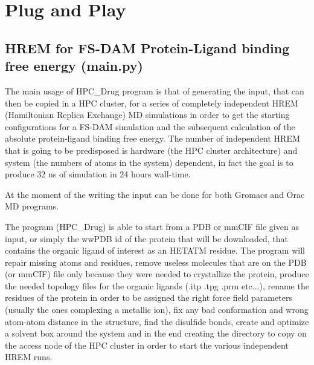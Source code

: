 


\section{Plug and Play}

	\subsection{HREM for FS-DAM Protein-Ligand binding free energy (main.py)}
	
		The main usage of HPC\_Drug program is that of generating the input, that can then be copied in a HPC cluster, for a series of completely independent HREM (Hamiltonian Replica Exchange) MD simulations in order to get the starting configurations for a FS-DAM simulation and the subsequent calculation of the absolute protein-ligand binding free energy. The number of independent HREM that is going to be predisposed is hardware (the HPC cluster architecture) and system (the numbers of atoms in the system) dependent, in fact the goal is to produce 32 ns of simulation in 24 hours wall-time.
		
		At the moment of the writing the input can be done for both Gromacs\cite{gromacs_ABRAHAM201519} and Orac\cite{orac} MD programs.
		
		The program (HPC\_Drug) is able to start from a PDB or mmCIF file given as input, or simply the wwPDB id of the protein that will be downloaded, that contains the organic ligand of interest as an HETATM residue. The program will repair missing atoms and residues, remove useless molecules that are on the PDB (or mmCIF) file only because they were needed to crystallize the protein, produce the needed topology files for the organic ligands (.itp .tpg .prm etc...), rename the residues of the protein in order to be assigned the right force field parameters (usually the ones complexing a metallic ion), fix any bad conformation and wrong atom-atom distance in the structure, find the disulfide bonds, create and optimize a solvent box around the system and in the end creating the directory to copy on the access node of the HPC cluster in order to start the various independent HREM runs.
		
